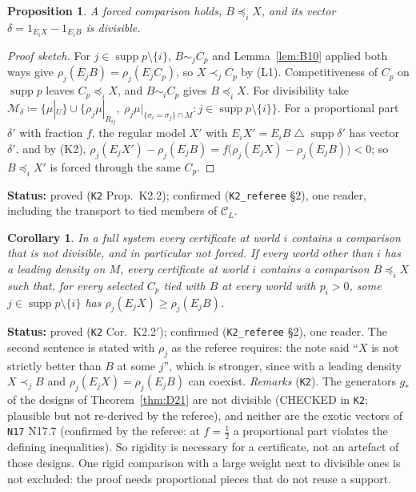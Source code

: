 \documentclass[11pt]{article}
\newtheorem{proposition}[theorem]{Proposition}
\newtheorem{corollary}[theorem]{Corollary}
\theoremstyle{definition}
\theoremstyle{remark}
\newcommand{\C}{\mathcal C}
\newcommand{\supp}{\operatorname{supp}}
\newcommand{\sd}{\mathbin{\triangle}}
\newcommand{\src}[1]{\texttt{#1}}
\newcommand{\status}[1]{\par\smallskip\noindent\textbf{Status:} #1\par\smallskip}
\begin{document}
\begin{proposition}\label{prop:K22}
A forced comparison holds, $B\preceq_iX$, and its vector $\delta=1_{E_iX}-1_{E_iB}$ is divisible.
\end{proposition}
\begin{proof}[Proof sketch]
For $j\in\supp p\setminus\{i\}$, $B\sim_jC_p$ and Lemma~\ref{lem:B10} applied both ways give $\rho_j(E_jB)=\rho_j(E_jC_p)$, so $X\prec_jC_p$ by (L1). Competitiveness of $C_p$ on $\supp p$ leaves $C_p\preceq_iX$, and $B\sim_iC_p$ gives $B\preceq_iX$. For divisibility take $\mathcal M_\delta\coloneqq\{\mu|_U\}\cup\{\rho_j\mu|_{R_{ij}},\ \rho_j\mu|_{\{\sigma_i=\sigma_j\}\cap M}:j\in\supp p\setminus\{i\}\}$. For a proportional part $\delta'$ with fraction $f$, the regular model $X'$ with $E_iX'=E_iB\sd\supp\delta'$ has vector $\delta'$, and by (K2), $\rho_j(E_jX')-\rho_j(E_jB)=f\bigl(\rho_j(E_jX)-\rho_j(E_jB)\bigr)<0$; so $B\preceq_iX'$ is forced through the same $C_p$.
\end{proof}
\status{proved (\src{K2} Prop.~K2.2); confirmed (\src{K2\_referee} \S2), one reader, including the transport to tied members of $\C_L$.}

\begin{corollary}\label{cor:K22p}
In a full system every certificate at world $i$ contains a comparison that is not divisible, and in particular not forced. If every world other than $i$ has a leading density on $M$, every certificate at world $i$ contains a comparison $B\preceq_iX$ such that, for every selected $C_p$ tied with $B$ at every world with $p_i>0$, some $j\in\supp p\setminus\{i\}$ has $\rho_j(E_jX)\ge\rho_j(E_jB)$.
\end{corollary}
\status{proved (\src{K2} Cor.~K2.2$'$); confirmed (\src{K2\_referee} \S2), one reader. The second sentence is stated with $\rho_j$ as the referee requires: the note said ``$X$ is not strictly better than $B$ at some $j$'', which is stronger, since with a leading density $X\prec_jB$ and $\rho_j(E_jX)=\rho_j(E_jB)$ can coexist. \emph{Remarks} (\src{K2}). The generators $g_*$ of the designs of Theorem~\ref{thm:D21} are not divisible (CHECKED in \src{K2}; plausible but not re-derived by the referee), and neither are the exotic vectors of \src{N17} N17.7 (confirmed by the referee: at $f=\frac12$ a proportional part violates the defining inequalities). So rigidity is necessary for a certificate, not an artefact of those designs. One rigid comparison with a large weight next to divisible ones is not excluded: the proof needs proportional pieces that do not reuse a support.}
\end{document}

